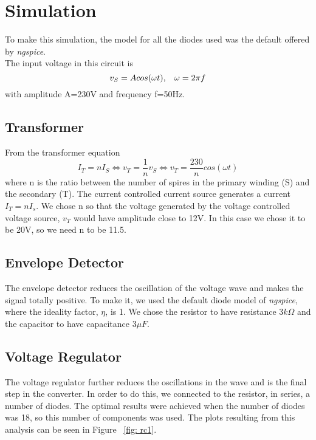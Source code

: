 \section{Simulation}
\label{sec: sim}
To make this simulation, the model for all the diodes used was the default offered by \textit{ngspice}. \\
The input voltage in this circuit is 
\begin{equation}\label{eq: vs}
v_S=Acos(\omega t),\hspace{3mm} \omega=2\pi f
\end{equation}
with amplitude A=230V and frequency f=50Hz.
\subsection{Transformer}
From the transformer equation 
\begin{equation}
  I_T=nI_S\Leftrightarrow v_T=\frac{1}{n}v_S \Leftrightarrow v_T=\frac{230}{n}cos(\omega t)
\end{equation}
where n is the ratio between the number of spires in the primary winding (S) and the secondary (T).
The current controlled current source generates a current $I_T=nI_s$. We chose n so that the voltage generated by the voltage controlled voltage source, $v_T$ would have amplitude close to 12V. In this case we chose it to be 20V, so we need n to be 11.5.\\
\subsection{Envelope Detector}
The envelope detector reduces the oscillation of the voltage wave and makes the signal totally positive.  To make it, we used the default diode model of \textit{ngspice}, where the ideality factor, $\eta$, is 1. We chose the resistor to have resistance $3k\Omega$ and the capacitor to have capacitance $3\mu F$.\\
\subsection{Voltage Regulator}
The voltage regulator further reduces the oscillations in the wave and is the final step in the converter. In order to do this, we connected to the resistor, in series, a number of diodes. The optimal results were achieved when the number of diodes was 18, so this number of components was used. 
The plots resulting from this analysis can be seen in Figure ~\ref{fig: rc1}. 
